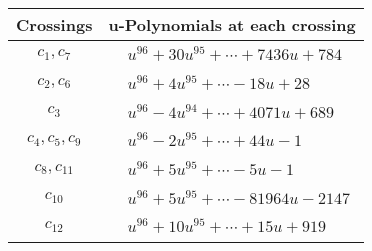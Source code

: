 \documentclass[1p]{elsarticle_modified}
\theoremstyle{definition}
\begin{document}
\begin{tabular}{m{50pt}|m{274pt}}
Crossings & \hspace{64pt}u-Polynomials at each crossing \\
\hline $$\begin{aligned}c_{1},c_{7}\end{aligned}$$&$\begin{aligned}
&u^{96}+30 u^{95}+\cdots+7436 u+784
\end{aligned}$\\
\hline $$\begin{aligned}c_{2},c_{6}\end{aligned}$$&$\begin{aligned}
&u^{96}+4 u^{95}+\cdots-18 u+28
\end{aligned}$\\
\hline $$\begin{aligned}c_{3}\end{aligned}$$&$\begin{aligned}
&u^{96}-4 u^{94}+\cdots+4071 u+689
\end{aligned}$\\
\hline $$\begin{aligned}c_{4},c_{5},c_{9}\end{aligned}$$&$\begin{aligned}
&u^{96}-2 u^{95}+\cdots+44 u-1
\end{aligned}$\\
\hline $$\begin{aligned}c_{8},c_{11}\end{aligned}$$&$\begin{aligned}
&u^{96}+5 u^{95}+\cdots-5 u-1
\end{aligned}$\\
\hline $$\begin{aligned}c_{10}\end{aligned}$$&$\begin{aligned}
&u^{96}+5 u^{95}+\cdots-81964 u-2147
\end{aligned}$\\
\hline $$\begin{aligned}c_{12}\end{aligned}$$&$\begin{aligned}
&u^{96}+10 u^{95}+\cdots+15 u+919
\end{aligned}$\\
\hline
\end{tabular}\\~\\
\newpage\renewcommand{\arraystretch}{1}
\end{document}
